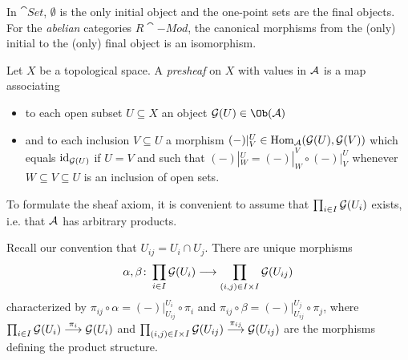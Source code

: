 \documentclass[a4paper,parskip=half,numbers=enddot, DIV=12]{scrreprt}
\begin{document}
  \begin{rem*}
  	In $\cat{Set}$, $\emptyset$ is the only initial object and the one-point sets are the final objects. For the \emph{abelian} categories $R\cat{-Mod}$, the canonical morphisms from the (only) initial to the (only) final object is an isomorphism.
  \end{rem*}
	Let $X$ be a topological space. A \emph{presheaf} on $X$ with values in $\mathcal{A}$ is a map associating
	\begin{itemize}
		\item to each open subset $U\subseteq X$ an object $\Gg(U)\in\Ob(\Aa)$
		\item and to each inclusion $V\subseteq U$ a morphism $(-)|_V^U\in\operatorname{Hom}_{\mathcal{A}}(\mathcal{G}(U), \mathcal{G}(V))$ which equals $\operatorname{id}_{\mathcal{G}(U)}$ if $U=V$ and such that $(-)|_W^U=(-)|_W^V\circ(-)|_V^U$ whenever $W\subseteq V\subseteq U$ is an inclusion of open sets.
	\end{itemize}
	To formulate the sheaf axiom, it is convenient to assume that $\prod_{i\in I}\mathcal{G}(U_i)$ exists, i.e. that $\mathcal{A}$ has arbitrary products.
	
	Recall our convention that $U_{ij}=U_i\cap U_j$. There are unique morphisms
	\begin{align*}
		\alpha,\beta\colon \prod_{i\in I}\mathcal{G}(U_i)\longrightarrow\prod_{(i,j)\in I\times I}\mathcal{G}(U_{ij})
	\end{align*}
	characterized by $\pi_{ij}\circ\alpha=(-)|_{U_{ij}}^{U_i}\circ\pi_i$ and $\pi_{ij}\circ\beta=(-)|_{U_{ij}}^{U_j}\circ\pi_j$, where $\prod_{i\in I}\Gg(U_i)\morphism[\pi_i]\Gg(U_i)$ and $\prod_{(i,j)\in I\times I}\Gg(U_{ij})\morphism[\pi_{ij}]\Gg(U_{ij})$ are the morphisms defining the product structure.
	
\end{document}
